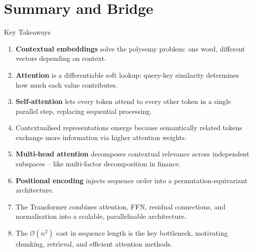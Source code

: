 \documentclass[aspectratio=169]{beamer}
\begin{document}
\section{Summary and Bridge}
%
\begin{frame}{Key Takeaways}
  \begin{enumerate}
    \item \textbf{Contextual embeddings} solve the polysemy problem: one word,
          different vectors depending on context.
    \item \textbf{Attention} is a differentiable soft lookup: query-key similarity
          determines how much each value contributes.
    \item \textbf{Self-attention} lets every token attend to every other token in a
          single parallel step, replacing sequential processing.
    \item Contextualised representations emerge because semantically related tokens
          exchange more information via higher attention weights.
    \item \textbf{Multi-head attention} decomposes contextual relevance across
          independent subspaces – like multi-factor decomposition in finance.
    \item \textbf{Positional encoding} injects sequence order into a
          permutation-equivariant architecture.
    \item The Transformer combines attention, FFN, residual connections, and
          normalisation into a scalable, parallelisable architecture.
    \item The $\mathcal{O}(n^2)$ cost in sequence length is the key bottleneck,
          motivating chunking, retrieval, and efficient attention methods.
  \end{enumerate}
\end{frame}
%
%
\end{document}
